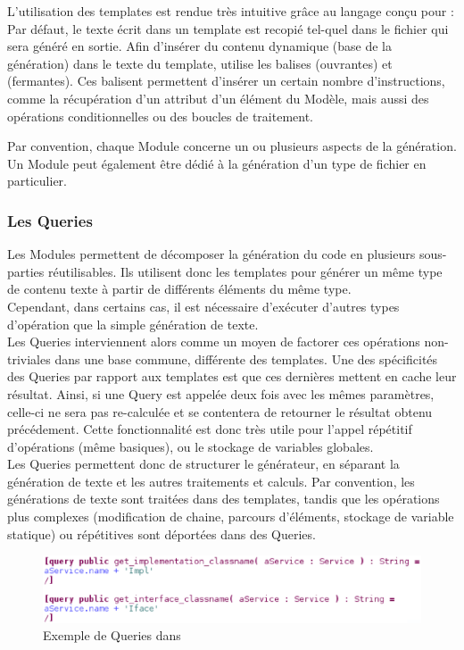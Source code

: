 L'utilisation des templates est rendue très intuitive grâce au langage conçu pour \kwacceleo{} : Par défaut, le texte écrit dans un template est recopié tel-quel dans le fichier qui sera généré en sortie. Afin d'insérer du contenu dynamique (base de la génération) dans le texte du template, \kwacceleo{} utilise les balises \guim{\textbf{[}} (ouvrantes) et \guim{\textbf{/]}} (fermantes). Ces balisent permettent d'insérer un certain nombre d'instructions, comme la récupération d'un attribut d'un élément du Modèle, mais aussi des opérations conditionnelles ou des boucles de traitement.

Par convention, chaque Module concerne un ou plusieurs aspects de la génération. Un Module peut également être dédié à la génération d'un type de fichier en particulier.



\subsubsection{Les Queries}

Les Modules permettent de décomposer la génération du code en plusieurs sous-parties réutilisables. Ils utilisent donc les templates pour générer un même type de contenu texte à partir de différents éléments du même type.\\
Cependant, dans certains cas, il est nécessaire d'exécuter d'autres types d'opération que la simple génération de texte.\\
Les Queries interviennent alors comme un moyen de factorer ces opérations non-triviales dans une base commune, différente des templates.
Une des spécificités des Queries par rapport aux templates est que ces dernières mettent en cache leur résultat. Ainsi, si une Query est appelée deux fois avec les mêmes paramètres, celle-ci ne sera pas re-calculée et se contentera de retourner le résultat obtenu précédement. Cette fonctionnalité est donc très utile pour l'appel répétitif d'opérations (même basiques), ou le stockage de variables globales.\\
Les Queries permettent donc de structurer le générateur, en séparant la génération de texte et les autres traitements et calculs. Par convention, les générations de texte sont traitées dans des templates, tandis que les opérations plus complexes (modification de chaine, parcours d'éléments, stockage de variable statique) ou répétitives sont déportées dans des Queries.

\begin{figure}[htb]
  \centering
  \includegraphics[scale=0.6]{img/screen_query.eps}
  \caption{Exemple de Queries dans \kwacceleo{}}
  \label{fig:acc_module}
\end{figure}

